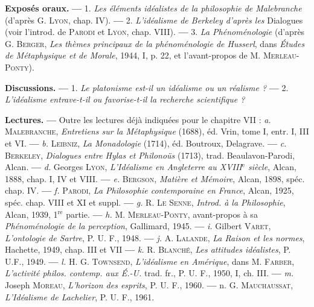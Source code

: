 {\bf Exposés oraux.} {\bf —} 1. {\it Les éléments idéalistes de la philosophie de Malebranche}
(d’après G. \textsc{Lyon}, chap. IV). {\bf —} 2. {\it L'idéalisme de Berkeley d'après
les} Dialogues (voir l'introd. de \textsc{Parodi} et \textsc{Lyon}, chap. VIII). {\bf —} 3. {\it La
Phénoménologie} (d’après G. \textsc{Berger}, {\it Les thèmes principaux de la phénoménologie
de Husserl}, dans {\it Études de Métaphysique et de Morale}, 1944, I,
p. 22, et l’avant-propos de M. \textsc{Merleau-Ponty}).

{\bf Discussions.} {\bf —} 1. {\it Le platonisme est-il un idéalisme ou un réalisme ?} {\bf —}
2. {\it L'idéalisme entrave-t-il ou favorise-t-il la recherche scientifique ?}

{\bf Lectures.} {\bf —} Outre les lectures déjà indiquées pour le chapitre VII :
{\it a.} \textsc{Malebranche}, {\it Entretiens sur la Métaphysique} (1688), éd. Vrin, tome I,
entr. I, III et VI. {\bf —} {\it b.} \textsc{Leibniz}, {\it La Monadologie} (1714), éd. Boutroux,
Delagrave. {\bf —} {\it c.} \textsc{Berkeley}, {\it Dialogues entre Hylas et Philonoüs} (1713),
trad. Beaulavon-Parodi, Alcan. {\bf —} {\it d.} Georges \textsc{Lyon}, {\it L'Idéalisme en
Angleterre au {\footnotesize XVIII}$^\text{e}$ siècle}, Alcan, 1888, chap. I, IV et VIII. {\bf —} {\it e.} \textsc{Bergson},
{\it Matière et Mémoire}, Alcan, 1898, spéc. chap. IV. {\bf —} {\it f.} \textsc{Parodi}, {\it La Philosophie
contemporaine en France}, Alcan, 1925, spéc. chap. VIII et XI et
suppl. {\bf —} {\it g.} R. \textsc{Le Senne}, {\it Introd. à la Philosophie}, Alcan, 1939, 1$^\text{re}$ partie.
{\bf —} {\it h.} M. \textsc{Merleau-Ponty}, avant-propos à sa {\it Phénoménologie de la perception},
Gallimard, 1945. {\bf —} {\it i.} Gilbert \textsc{Varet}, {\it L'ontologie de Sartre}, P. U. F.,
1948. {\bf —} {\it j.} A. \textsc{Lalande}, {\it La Raison et les normes}, Hachette, 1949, chap. III
et VII {\bf —} {\it k.} R. \textsc{Blanché}, {\it Les attitudes idéalistes}, P. U.F., 1949.
{\bf —} {\it l.} H. G. \textsc{Townsend}, {\it L'idéalisme en Amérique}, dans M. \textsc{Farber}, {\it L’activité
philos. contemp. aux É.-U.} trad. fr., P. U. F., 1950, I, ch. III. {\bf —} {\it m.} Joseph
\textsc{Moreau}, {\it L'horizon des esprits}, P. U. F., 1960. {\bf —} n. G. \textsc{Mauchaussat},
{\it L'Idéalisme de Lachelier}, P. U. F., 1961.

